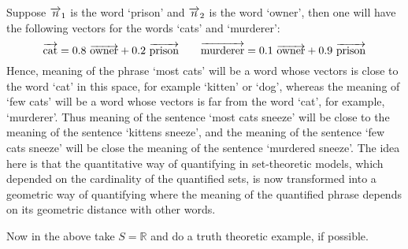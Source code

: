 Suppose $\overrightarrow{n}_1$ is the word  `prison' and $\overrightarrow{n}_2$ is the word `owner', then one will have the following vectors for the words `cats' and `murderer':
\[
\overrightarrow{\text{cat}} = 0.8 \  \overrightarrow{\text{owner}} + 0.2 \ \overrightarrow{\text{prison}}
\qquad
\overrightarrow{\text{murderer}} = 0.1\  \overrightarrow{\text{owner}} + 0.9 \  \overrightarrow{\text{prison}}
\]
Hence,  meaning of the phrase   `most cats' will  be a word whose vectors is close to the word `cat' in this space, for example `kitten' or `dog', whereas the meaning of `few cats' will be a word whose vectors is far from the word `cat', for example, `murderer'. Thus meaning of the sentence `most cats sneeze' will be close to the meaning of the sentence `kittens sneeze', and the meaning of the sentence `few cats sneeze' will be close the meaning of the sentence `murdered sneeze'. The idea here is that the quantitative way of quantifying in set-theoretic models, which depended on the cardinality of the quantified sets, is now transformed into a geometric way of quantifying where the meaning of the quantified phrase depends on its geometric distance with other words. 

Now in the above take $S = \mathbb{R}$ and do a truth theoretic example, if possible. 


